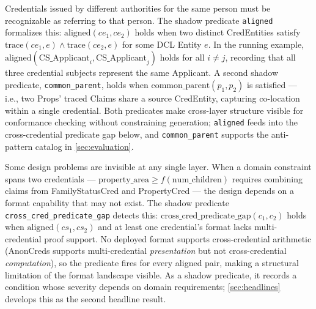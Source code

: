Credentials issued by different authorities for the same person must be recognizable as referring to that person. The shadow predicate \texttt{aligned} formalizes this: \(\text{aligned}(ce_1, ce_2)\) holds when two distinct CredEntities satisfy \(\text{trace}(ce_1, e) \wedge \text{trace}(ce_2, e)\) for some DCL Entity \(e\). In the running example, \(\text{aligned}(\text{CS\_Applicant}_i, \text{CS\_Applicant}_j)\) holds for all \(i \neq j\), recording that all three credential subjects represent the same Applicant. A second shadow predicate, \texttt{common\_parent}, holds when \(\text{common\_parent}(p_1, p_2)\) is satisfied --- i.e., two Props' traced Claims share a source CredEntity, capturing co-location within a single credential. Both predicates make cross-layer structure visible for conformance checking without constraining generation; \texttt{aligned} feeds into the cross-credential predicate gap below, and \texttt{common\_parent} supports the anti-pattern catalog in \autoref{sec:evaluation}.

Some design problems are invisible at any single layer. When a domain constraint spans two credentials --- \(\text{property\_area} \geq f(\text{num\_children})\) requires combining claims from FamilyStatusCred and PropertyCred --- the design depends on a format capability that may not exist. The shadow predicate \texttt{cross\_cred\_predicate\_gap} detects this: \(\text{cross\_cred\_predicate\_gap}(c_1, c_2)\) holds when \(\text{aligned}(cs_1, cs_2)\) and at least one credential's format lacks multi-credential proof support. No deployed format supports cross-credential arithmetic (AnonCreds supports multi-credential \emph{presentation} but not cross-credential \emph{computation}), so the predicate fires for every aligned pair, making a structural limitation of the format landscape visible. As a shadow predicate, it records a condition whose severity depends on domain requirements; \autoref{sec:headlines} develops this as the second headline result.



